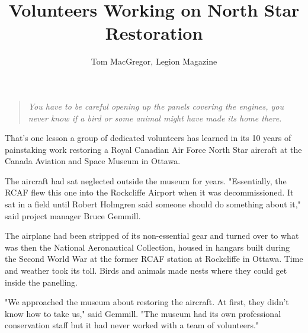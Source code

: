 %


\title{Volunteers Working on North Star Restoration}
\author{Tom MacGregor, Legion Magazine}

\maketitle


\begin{quotation}
	\textit{You have to be careful opening up the panels covering the 
	engines, you never know if a bird or some animal might have made
	its home there.}
\end{quotation}

That's one lesson a group of dedicated volunteers has learned in its
10 years of painstaking work restoring a Royal Canadian Air Force
North Star aircraft at the Canada Aviation and Space Museum in Ottawa.


The aircraft had sat neglected outside the museum for
years. "Essentially, the RCAF flew this one into the Rockcliffe Airport
when it was decommissioned. It sat in a field until Robert Holmgren said
someone should do something about it," said project manager Bruce
Gemmill.

The airplane had been stripped of its non-essential gear and turned
over to what was then the National Aeronautical Collection, housed in
hangars built during the Second World War at the former RCAF station
at Rockcliffe in Ottawa. Time and weather took its toll. Birds and
animals made nests where they could get inside the panelling.

"We approached the museum about restoring the aircraft. At first, they
didn't know how to take us," said Gemmill. "The museum had its own
professional conservation staff but it had never worked with a team of
volunteers."

